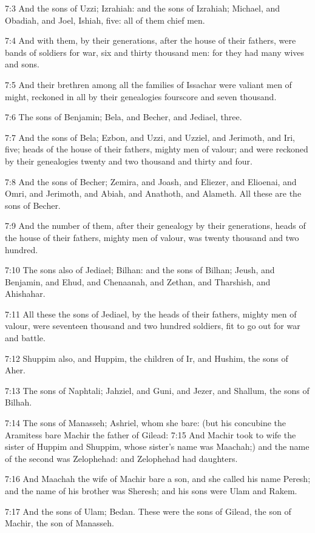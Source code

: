 7:3 And the sons of Uzzi; Izrahiah: and the sons of Izrahiah; Michael,
and Obadiah, and Joel, Ishiah, five: all of them chief men.

7:4 And with them, by their generations, after the house of their
fathers, were bands of soldiers for war, six and thirty thousand men:
for they had many wives and sons.

7:5 And their brethren among all the families of Issachar were valiant
men of might, reckoned in all by their genealogies fourscore and seven
thousand.

7:6 The sons of Benjamin; Bela, and Becher, and Jediael, three.

7:7 And the sons of Bela; Ezbon, and Uzzi, and Uzziel, and Jerimoth,
and Iri, five; heads of the house of their fathers, mighty men of
valour; and were reckoned by their genealogies twenty and two thousand
and thirty and four.

7:8 And the sons of Becher; Zemira, and Joash, and Eliezer, and
Elioenai, and Omri, and Jerimoth, and Abiah, and Anathoth, and
Alameth. All these are the sons of Becher.

7:9 And the number of them, after their genealogy by their
generations, heads of the house of their fathers, mighty men of
valour, was twenty thousand and two hundred.

7:10 The sons also of Jediael; Bilhan: and the sons of Bilhan; Jeush,
and Benjamin, and Ehud, and Chenaanah, and Zethan, and Tharshish, and
Ahishahar.

7:11 All these the sons of Jediael, by the heads of their fathers,
mighty men of valour, were seventeen thousand and two hundred
soldiers, fit to go out for war and battle.

7:12 Shuppim also, and Huppim, the children of Ir, and Hushim, the
sons of Aher.

7:13 The sons of Naphtali; Jahziel, and Guni, and Jezer, and Shallum,
the sons of Bilhah.

7:14 The sons of Manasseh; Ashriel, whom she bare: (but his concubine
the Aramitess bare Machir the father of Gilead: 7:15 And Machir took
to wife the sister of Huppim and Shuppim, whose sister's name was
Maachah;) and the name of the second was Zelophehad: and Zelophehad
had daughters.

7:16 And Maachah the wife of Machir bare a son, and she called his
name Peresh; and the name of his brother was Sheresh; and his sons
were Ulam and Rakem.

7:17 And the sons of Ulam; Bedan. These were the sons of Gilead, the
son of Machir, the son of Manasseh.


